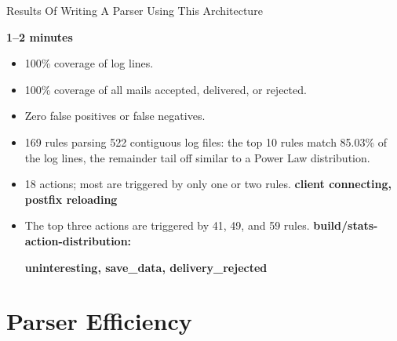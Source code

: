 \documentclass{beamer}
\newcommand{\timingnote}[1]{%
    \textbf{#1}%
}
\begin{document}
\begin{frame}{Results Of Writing A Parser Using This Architecture}

    \timingnote{1--2 minutes}

    \begin{itemize}

        \item 100\% coverage of log lines.

        \item 100\% coverage of all mails accepted, delivered, or rejected.

        \item Zero false positives or false negatives.

        \item 169 rules parsing 522 contiguous log files: the top 10 rules
            match 85.03\% of the log lines, the remainder tail off similar
            to a Power Law distribution.

        \item 18 actions; most are triggered by only one or two rules.
            \timingnote{client connecting, postfix reloading}

        \item The top three actions are triggered by 41, 49, and 59 rules.
            \timingnote{build/stats-action-distribution:}
            \timingnote{uninteresting, save\_data, delivery\_rejected}

    \end{itemize}

\end{frame}

\section{Parser Efficiency}
\end{document}
